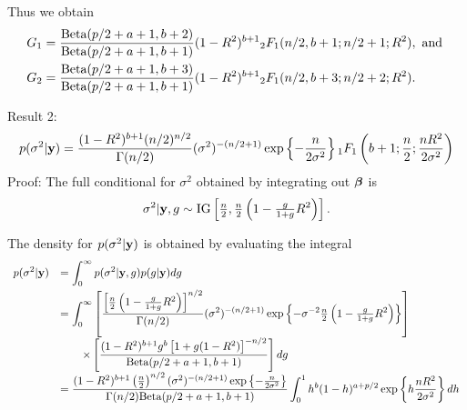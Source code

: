\documentclass{amsart}[12pt]
\begin{document}
\noindent Thus we obtain
\begin{align*}
	G_1 & = \frac{\text{Beta}(p/2 + a + 1, b + 2)}{\text{Beta}(p /2 + a + 1, b + 1)} (1 - R^2)^{b+1} {}_2 F_1(n/2, b + 1; n/2 + 1; R^2), \text{ and } \\
	G_2 & = \frac{\text{Beta}(p/2 + a + 1, b + 3)}{\text{Beta}(p /2 + a + 1, b + 1)} (1 - R^2)^{b+1} {}_2 F_1(n/2, b + 3; n/2 + 2; R^2).              
\end{align*}

Result 2:
\[
	p(\sigma^2|{\bf y}) 
		  \displaystyle = \frac{(1 -  R^2)^{b+1} ( n/2)^{n/2}}{\Gamma(n/2)} 
		(\sigma^2)^{-(n/2 + 1)}\exp\left\{ -  \frac{n}{2 \sigma^{2}}  \right\}  {}_1 F_1\left(
		b + 1; \frac{n}{2}; \frac{nR^2}{2 \sigma^{2}}  \right)
\]
Proof:
\noindent The full conditional for $\sigma^2$ obtained by integrating out ${\boldsymbol \beta}$ is
\begin{equation}
	\sigma^2|{\bf y},g \sim \mbox{IG}\left[\tfrac{n}{2},\tfrac{n}{2}\left( 
		1 -
	\tfrac{g}{1+g} R^2\right) \right].
\end{equation}

\noindent The density for $p(\sigma^2|\vy)$ is obtained by evaluating the integral
$$
\begin{array}{rl}
	\ds p(\sigma^2|\vy) 
	  & \ds = \int_0^\infty p(\sigma^2|\vy,g) p(g|\vy) dg                                                                                                                                  
	    
	\\ [2ex]
	    
	  & \ds = \int_0^\infty                                                                                                                                                                
	\left[ \frac{\left[\tfrac{n}{2}\left( 
	1 -
	\tfrac{g}{1+g} R^2\right) \right]^{n/2}}{\Gamma(n/2)} (\sigma^2)^{-(n/2 + 1)} \exp\left\{ - \sigma^{-2} \tfrac{n}{2}\left( 
	1 -
	\tfrac{g}{1+g} R^2\right) \right\} \right]
	\\ [2ex]
	  & \ds \qquad \times \left[                                                                                                                                                           
	\frac{(1 -  R^2)^{b+1} g^{b} \left[  1 + g(1 -  R^2) \right]^{-n/2}}{\mbox{Beta}(p/2 + a + 1,b+1)}
	\right] dg
	    
	\\ [2ex]
	  & \ds = \frac{ (1 -  R^2)^{b+1}\left( \frac{n}{2}\right)^{n/2}(\sigma^2)^{-(n/2 + 1)}\exp\left\{ -  \tfrac{n}{2\sigma^2} \right\}}{\Gamma(n/2)\mbox{Beta}(p/2 + a + 1,b+1)} \int_0^1 
	h^{b}(1-h)^{a+p/2} 
	\exp\left\{ 
	h \frac{nR^2}{2\sigma^2} \right\}  dh    
\end{array}
$$
\end{document}
